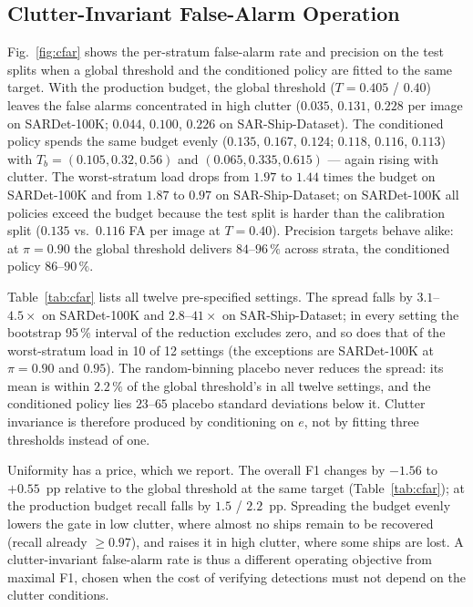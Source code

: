 \documentclass[journal]{IEEEtran}
\providecommand{\linelabel}[1]{}
\begin{document}
\subsection{Clutter-Invariant False-Alarm Operation}
\label{sec:cfar}
\linelabel{ln:cfar}Fig.~\ref{fig:cfar} shows the per-stratum false-alarm rate and precision
on the test splits when a global threshold and the conditioned policy are
fitted to the same target. With the production budget, the global
threshold ($T{=}0.405$ / $0.40$) leaves the false alarms concentrated in
high clutter ($0.035$, $0.131$, $0.228$ per image on SARDet-100K;
$0.044$, $0.100$, $0.226$ on SAR-Ship-Dataset). The conditioned policy
spends the same budget evenly ($0.135$, $0.167$, $0.124$; $0.118$,
$0.116$, $0.113$) with $T_b=(0.105, 0.32, 0.56)$ and
$(0.065, 0.335, 0.615)$ --- again rising with clutter. The worst-stratum
load drops from $1.97$ to $1.44$ times the budget on SARDet-100K and from
$1.87$ to $0.97$ on SAR-Ship-Dataset; on SARDet-100K all policies exceed
the budget because the test split is harder than the calibration split
($0.135$ vs.\ $0.116$ FA per image at $T{=}0.40$). Precision targets behave
alike: at $\pi{=}0.90$ the global threshold delivers $84$--$96\,\%$
across strata, the conditioned policy $86$--$90\,\%$.

Table~\ref{tab:cfar} lists all twelve pre-specified settings. The spread
falls by $3.1$--$4.5\times$ on SARDet-100K and $2.8$--$41\times$ on
SAR-Ship-Dataset; in every setting the bootstrap 95\,\% interval of the
reduction excludes zero, and so does that of the worst-stratum load in
10 of 12 settings (the exceptions are SARDet-100K at $\pi{=}0.90$ and
$0.95$). The random-binning placebo never reduces the spread: its mean is
within $2.2\,\%$ of the global threshold's in all twelve settings, and the
conditioned policy lies $23$--$65$ placebo standard deviations below it.
Clutter invariance is therefore produced by conditioning on $e$, not by
fitting three thresholds instead of one.

Uniformity has a price, which we report. The overall F1 changes by
$-1.56$ to $+0.55$~pp relative to the global threshold at the same
target (Table~\ref{tab:cfar}); at the production budget recall falls by
$1.5$ / $2.2$~pp. Spreading the budget evenly lowers the gate in low
clutter, where almost no ships remain to be recovered (recall already
$\ge0.97$), and raises it in high clutter, where some ships are lost. A
clutter-invariant false-alarm rate is thus a different operating
objective from maximal F1, chosen when the cost of verifying detections
must not depend on the clutter conditions.\linelabel{ln:cfarend}
\end{document}
